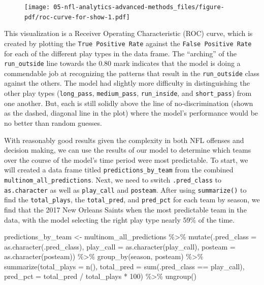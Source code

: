 \documentclass[
  letterpaper,
]{krantz}
\newenvironment{Shaded}{\begin{snugshade}}{\end{snugshade}}
\newcommand{\AttributeTok}[1]{\textcolor[rgb]{0.40,0.45,0.13}{#1}}
\newcommand{\DecValTok}[1]{\textcolor[rgb]{0.68,0.00,0.00}{#1}}
\newcommand{\FunctionTok}[1]{\textcolor[rgb]{0.28,0.35,0.67}{#1}}
\newcommand{\NormalTok}[1]{\textcolor[rgb]{0.00,0.23,0.31}{#1}}
\newcommand{\OtherTok}[1]{\textcolor[rgb]{0.00,0.23,0.31}{#1}}
\newcommand{\SpecialCharTok}[1]{\textcolor[rgb]{0.37,0.37,0.37}{#1}}
\begin{document}
\begin{figure}

{\centering \texttt{[image: 05-nfl-analytics-advanced-methods\_files/figure-pdf/roc-curve-for-show-1.pdf]}

}

\end{figure}

This visualization is a Receiver Operating Characteristic (ROC) curve,
which is created by plotting the \texttt{True\ Positive\ Rate} against
the \texttt{False\ Positive\ Rate} for each of the different play types
in the data frame. The ``arching'' of the \texttt{run\_outside} line
towards the 0.80 mark indicates that the model is doing a commendable
job at recognizing the patterns that result in the \texttt{run\_outside}
class against the others. The model had slightly more difficulty in
distinguishing the other play types (\texttt{long\_pass},
\texttt{medium\_pass}, \texttt{run\_inside}, and \texttt{short\_pass})
from one another. But, each is still solidly above the line of
no-discrimination (shown as the dashed, diagonal line in the plot) where
the model's performance would be no better than random guesses.

With reasonably good results given the complexity in both NFL offenses
and decision making, we can use the results of our model to determine
which teams over the course of the model's time period were most
predictable. To start, we will created a data frame titled
\texttt{predictions\_by\_team} from the combined
\texttt{multinom\_all\_predictions}. Next, we need to switch
\texttt{.pred\_class} to \texttt{as.character} as well as
\texttt{play\_call} and \texttt{posteam}. After using
\texttt{summarize()} to find the \texttt{total\_plays}, the
\texttt{total\_pred}, and \texttt{pred\_pct} for each team by season, we
find that the 2017 New Orleans Saints when the most predictable team in
the data, with the model selecting the right play type nearly 59\% of
the time.

\begin{Shaded}
\begin{Highlighting}[]
\NormalTok{predictions\_by\_team }\OtherTok{\textless{}{-}}\NormalTok{ multinom\_all\_predictions }\SpecialCharTok{\%\textgreater{}\%}
  \FunctionTok{mutate}\NormalTok{(}\AttributeTok{.pred\_class =} \FunctionTok{as.character}\NormalTok{(.pred\_class),}
         \AttributeTok{play\_call =} \FunctionTok{as.character}\NormalTok{(play\_call),}
         \AttributeTok{posteam =} \FunctionTok{as.character}\NormalTok{(posteam)) }\SpecialCharTok{\%\textgreater{}\%}
  \FunctionTok{group\_by}\NormalTok{(season, posteam) }\SpecialCharTok{\%\textgreater{}\%}
  \FunctionTok{summarize}\NormalTok{(}\AttributeTok{total\_plays =} \FunctionTok{n}\NormalTok{(),}
            \AttributeTok{total\_pred =} \FunctionTok{sum}\NormalTok{(.pred\_class }\SpecialCharTok{==}\NormalTok{ play\_call),}
            \AttributeTok{pred\_pct =}\NormalTok{ total\_pred }\SpecialCharTok{/}\NormalTok{ total\_plays }\SpecialCharTok{*} \DecValTok{100}\NormalTok{) }\SpecialCharTok{\%\textgreater{}\%}
  \FunctionTok{ungroup}\NormalTok{()}
\end{Highlighting}
\end{Shaded}
\end{document}
